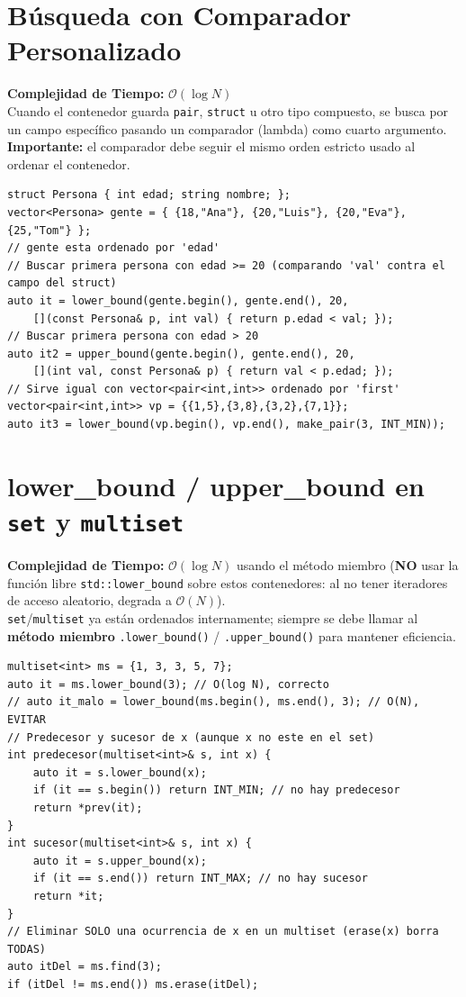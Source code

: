 \documentclass[10pt,twocolumn,letterpaper]{report}
\begin{document}
\section{Búsqueda con Comparador Personalizado}
\textbf{Complejidad de Tiempo:} $\mathcal{O}(\log N)$ \\
Cuando el contenedor guarda \texttt{pair}, \texttt{struct} u otro tipo compuesto, se busca por un campo específico pasando un comparador (lambda) como cuarto argumento. \textbf{Importante:} el comparador debe seguir el mismo orden estricto usado al ordenar el contenedor.
\begin{lstlisting}
struct Persona { int edad; string nombre; };
vector<Persona> gente = { {18,"Ana"}, {20,"Luis"}, {20,"Eva"}, {25,"Tom"} };
// gente esta ordenado por 'edad'
// Buscar primera persona con edad >= 20 (comparando 'val' contra el campo del struct)
auto it = lower_bound(gente.begin(), gente.end(), 20,
    [](const Persona& p, int val) { return p.edad < val; });
// Buscar primera persona con edad > 20
auto it2 = upper_bound(gente.begin(), gente.end(), 20,
    [](int val, const Persona& p) { return val < p.edad; });
// Sirve igual con vector<pair<int,int>> ordenado por 'first'
vector<pair<int,int>> vp = {{1,5},{3,8},{3,2},{7,1}};
auto it3 = lower_bound(vp.begin(), vp.end(), make_pair(3, INT_MIN));
\end{lstlisting}
\section{lower\_bound / upper\_bound en \texttt{set} y \texttt{multiset}}
\textbf{Complejidad de Tiempo:} $\mathcal{O}(\log N)$ usando el método miembro (\textbf{NO} usar la función libre \texttt{std::lower\_bound} sobre estos contenedores: al no tener iteradores de acceso aleatorio, degrada a $\mathcal{O}(N)$). \\
\texttt{set}/\texttt{multiset} ya están ordenados internamente; siempre se debe llamar al \textbf{método miembro} \texttt{.lower\_bound()} / \texttt{.upper\_bound()} para mantener eficiencia.
\begin{lstlisting}
multiset<int> ms = {1, 3, 3, 5, 7};
auto it = ms.lower_bound(3); // O(log N), correcto
// auto it_malo = lower_bound(ms.begin(), ms.end(), 3); // O(N), EVITAR
// Predecesor y sucesor de x (aunque x no este en el set)
int predecesor(multiset<int>& s, int x) {
    auto it = s.lower_bound(x);
    if (it == s.begin()) return INT_MIN; // no hay predecesor
    return *prev(it);
}
int sucesor(multiset<int>& s, int x) {
    auto it = s.upper_bound(x);
    if (it == s.end()) return INT_MAX; // no hay sucesor
    return *it;
}
// Eliminar SOLO una ocurrencia de x en un multiset (erase(x) borra TODAS)
auto itDel = ms.find(3);
if (itDel != ms.end()) ms.erase(itDel);
\end{lstlisting}
\end{document}
